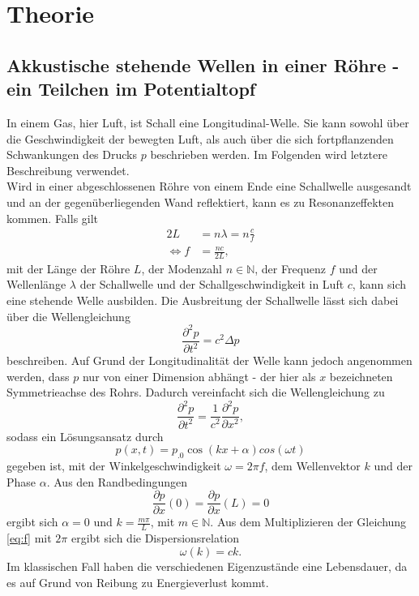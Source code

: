 \section{Theorie}
\label{sec:Theorie}

\subsection{Akkustische stehende Wellen in einer Röhre - ein Teilchen im Potentialtopf}
In einem Gas, hier Luft, ist Schall eine Longitudinal-Welle. Sie kann sowohl über die Geschwindigkeit der bewegten Luft, als auch über die sich fortpflanzenden Schwankungen des Drucks $p$ beschrieben werden. Im Folgenden wird letztere Beschreibung verwendet.\\
Wird in einer abgeschlossenen Röhre von einem Ende eine Schallwelle ausgesandt und an der gegenüberliegenden Wand reflektiert, kann es zu Resonanzeffekten kommen. Falls gilt
\begin{align}
2L&=n\lambda=n\frac{c}{f}\\
\Leftrightarrow f&=\frac{n c}{2L},\label{eq:f}
\end{align}
mit der Länge der Röhre $L$, der Modenzahl $n\in\mathbb{N}$, der Frequenz $f$ und der Wellenlänge $\lambda$ der Schallwelle und der Schallgeschwindigkeit in Luft $c$, kann sich eine stehende Welle ausbilden.
Die Ausbreitung der Schallwelle lässt sich dabei über die Wellengleichung
\begin{equation}
\frac{\partial^2 p}{\partial t^2}=c^2\Delta p\label{eq:WGL}
\end{equation}
beschreiben. Auf Grund der Longitudinalität der Welle kann jedoch angenommen werden, dass $p$ nur von einer Dimension abhängt - der hier als $x$ bezeichneten Symmetrieachse des Rohrs. Dadurch vereinfacht sich die Wellengleichung zu
\[
\frac{\partial^2 p}{\partial t^2}=\frac{1}{c^2}\frac{\partial^2 p}{\partial x^2},
\]
sodass ein Lösungsansatz durch
\[
p(x,t)=p_.0\cos(k x +\alpha)cos(\omega t)
\]
gegeben ist, mit der Winkelgeschwindigkeit $\omega=2\pi f$, dem Wellenvektor $k$ und der Phase $\alpha$. Aus den Randbedingungen 
\[
\frac{\partial p}{\partial x}(0)=\frac{\partial p}{\partial x}(L)=0
\]
ergibt sich $\alpha=0$ und $k=\frac{m\pi}{L}$, mit $m\in\mathbb{N}$.
Aus dem Multiplizieren der Gleichung \eqref{eq:f} mit $2\pi$ ergibt sich die Dispersionsrelation
\begin{equation}
\omega(k)=c k\text{.}\label{eq:w_k}
\end{equation}
Im klassischen Fall haben die verschiedenen Eigenzustände eine Lebensdauer, da es auf Grund von Reibung zu Energieverlust kommt.

